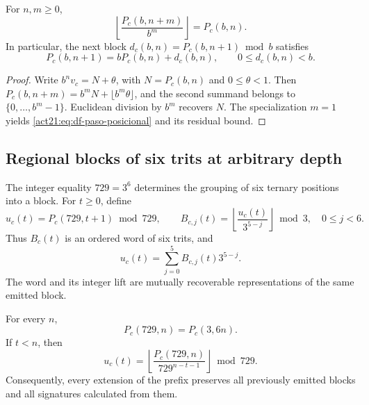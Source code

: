 \begin{proposition}
\label{act21:prop:df-prefijos-compatibles}
For \(n,m\geq0\),
\begin{equation}
 \left\lfloor\frac{P_c(b,n+m)}{b^m}\right\rfloor=P_c(b,n).
 \label{act21:eq:df-truncamiento}
\end{equation}
In particular, the next block
\(d_c(b,n)=P_c(b,n+1)\bmod b\) satisfies
\begin{equation}
 P_c(b,n+1)=bP_c(b,n)+d_c(b,n),\qquad 0\leq d_c(b,n)<b.
 \label{act21:eq:df-paso-posicional}
\end{equation}
\end{proposition}

\begin{proof}
Write \(b^n v_c=N+\theta\), with
\(N=P_c(b,n)\) and \(0\leq\theta<1\). Then
\(P_c(b,n+m)=b^mN+\lfloor b^m\theta\rfloor\), and the second summand
belongs to \(\{0,\ldots,b^m-1\}\). Euclidean division by \(b^m\)
recovers \(N\). The specialization \(m=1\) yields
\eqref{act21:eq:df-paso-posicional} and its residual bound.
\end{proof}

\subsection{Regional blocks of six trits at arbitrary depth}
\label{act21:subsec:df-bloques-arbitrarios}


The integer equality \(729=3^6\) determines the grouping of six ternary
positions into a block. For \(t\geq0\), define
\begin{equation}
 u_c(t)=P_c(729,t+1)\bmod729,
 \qquad
 B_{c,j}(t)=
 \left\lfloor\frac{u_c(t)}{3^{5-j}}\right\rfloor\bmod3,
 \quad 0\leq j<6.
 \label{act21:eq:df-bloque-y-banda}
\end{equation}
Thus \(B_c(t)\) is an ordered word of six trits, and
\begin{equation}
 u_c(t)=\sum_{j=0}^{5}B_{c,j}(t)3^{5-j}.
 \label{act21:eq:df-elevacion-banda}
\end{equation}
The word and its integer lift are mutually recoverable representations
of the same emitted block.

\begin{theorem}
\label{act21:thm:df-bloque-estable}
For every \(n\),
\[
 P_c(729,n)=P_c(3,6n).
\]
If \(t<n\), then
\begin{equation}
 u_c(t)=
 \left\lfloor\frac{P_c(729,n)}{729^{n-t-1}}\right\rfloor\bmod729.
 \label{act21:eq:df-bloque-prefijo-largo}
\end{equation}
Consequently, every extension of the prefix preserves all previously
emitted blocks and all signatures calculated from them.
\end{theorem}

